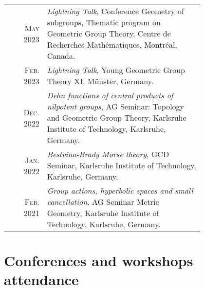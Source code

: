 \documentclass[a4paper,11pt]{article} %
\begin{document}
\begin{longtable}{rp{0.8\linewidth}}

    \textsc{May 2023} & \emph{Lightning Talk}, Conference Geometry of subgroups, Thematic program on Geometric Group Theory, Centre de Recherches Mathématiques, Montréal, Canada. \\

    \textsc{Feb. 2023} & \emph{Lightning Talk}, Young Geometric Group Theory XI, Münster, Germany.\\

    \textsc{Dec. 2022} & \emph{Dehn functions of central products of nilpotent groups}, AG Seminar: Topology and Geometric Group Theory, Karlsruhe Institute of Technology, Karlsruhe, Germany. \\

    \textsc{Jan. 2022} & \emph{Bestvina-Brady Morse theory}, GCD Seminar, Karlsruhe Institute of Technology, Karlsruhe, Germany. \\

    \textsc{Feb. 2021} & \emph{Group actions, hyperbolic spaces and small cancellation}, AG Seminar Metric Geometry, Karlsruhe Institute of Technology, Karlsruhe, Germany.\\
\end{longtable}


\section{Conferences and workshops attendance}
\end{document}
